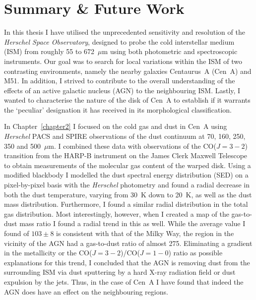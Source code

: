 \pagestyle{fancy}
\headheight 20pt
\chead{}
\lfoot{}
\cfoot{\thepage}
\rfoot{}
\renewcommand{\headrulewidth}{0.1pt}
\renewcommand{\footrulewidth}{0.1pt}

\chapter{Summary \& Future Work} \label{chapter5}
\thispagestyle{fancy}

In this thesis I have utilised the unprecedented sensitivity and resolution of the \emph{Herschel Space Observatory}, designed to probe the cold interstellar medium (ISM) from roughly 55 to 672~$\mu$m using both photometric and spectroscopic instruments.  Our goal was to search for local variations within the ISM of two contrasting environments, namely the nearby galaxies Centaurus~A (Cen~A) and M51.  In addition, I strived to contribute to the overall understanding of the effects of an active galactic nucleus (AGN) to the neighbouring ISM.  Lastly, I wanted to characterise the nature of the disk of Cen~A to establish if it warrants the `peculiar' designation it has received in its morphological classification.

In Chapter~\ref{chapter2} I focused on the cold gas and dust in Cen~A using \emph{Herschel} PACS and SPIRE observations of the dust continuum at 70, 160, 250, 350 and 500~$\mu$m.  I combined these data with observations of the CO($J=3-2$) transition from the HARP-B instrument on the James Clerk Maxwell Telescope to obtain measurements of the molecular gas content of the warped disk.  Using a modified blackbody I modelled the dust spectral energy distribution (SED) on a pixel-by-pixel basis with the \emph{Herschel} photometry and found a radial decrease in both the dust temperature, varying from 30~K down to 20~K, as well as the dust mass distribution.  Furthermore, I found a similar radial distribution in the total gas distribution.  Most interestingly, however, when I created a map of the gas-to-dust mass ratio I found a radial trend in this as well.  While the average value I found of $103 \pm 8$ is consistent with that of the Milky Way, the region in the vicinity of the AGN had a gas-to-dust ratio of almost 275.  Eliminating a gradient in the metallicity or the CO($J=3-2$)/CO($J=1-0$) ratio as possible explanations for this trend, I concluded that the AGN is removing dust from the surrounding ISM via dust sputtering by a hard X-ray radiation field or dust expulsion by the jets.  Thus, in the case of Cen~A I have found that indeed the AGN does have an effect on the neighbouring regions.

